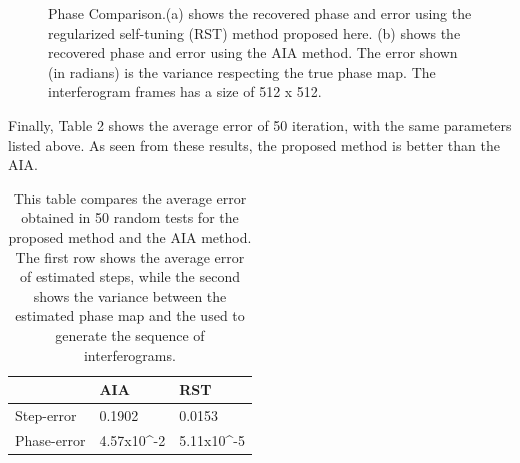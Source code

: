 \documentclass[letterpaper,12pt]{article}   %
\begin{document}
\begin{figure}[htp]
\begin{center}
	\end{center}
	\caption{Phase Comparison.(a) shows the recovered phase and error using the regularized self-tuning (RST) method proposed here. (b)  shows the recovered phase and error using the AIA method. The error shown (in radians) is the variance respecting the true phase map. The interferogram frames has a size of 512 x 512.}
	\label{fig:phase}
\end{figure}
Finally, Table 2 shows the average error of 50 iteration, with the same parameters listed above. As seen from these results, the proposed method is better than the AIA.

\begin{table}
	\begin{center}
		\begin{tabular}{|l|l|l|}
		\hline
		            & AIA    & RST 	    \\ \hline \hline
		Step-error  & 0.1902 & 0.0153	\\ \hline
		Phase-error & 4.57x10^{-2} & 5.11x10^{-5} \\ \hline
		
		\end{tabular}
	\end{center}
	\caption{This table compares the average error obtained in 50 random tests for the proposed method and the AIA method. The first row shows the average error of estimated steps, while the second shows the variance between the estimated phase map and the used to generate the sequence of interferograms.} 
	\label{Tab:mean-phase_error}
\end{table}
\end{document}

